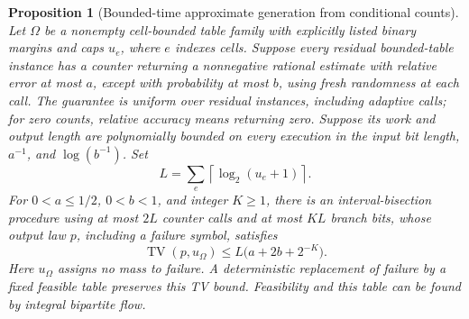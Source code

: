 \documentclass[11pt]{article}
\newtheorem{proposition}{Proposition}
\newcommand{\TV}{\operatorname{TV}}
\begin{document}
\begin{proposition}[Bounded-time approximate generation from conditional counts]
Let \(\Omega\) be a nonempty cell-bounded table family with explicitly listed binary margins and caps \(u_e\), where \(e\) indexes cells. Suppose every residual bounded-table instance has a counter returning a nonnegative rational estimate with relative error at most \(a\), except with probability at most \(b\), using fresh randomness at each call. The guarantee is uniform over residual instances, including adaptive calls; for zero counts, relative accuracy means returning zero. Suppose its work and output length are polynomially bounded on every execution in the input bit length, \(a^{-1}\), and \(\log(b^{-1})\).
Set
\[
 L=\sum_e\left\lceil\log_2(u_e+1)\right\rceil.
\]
For \(0<a\leq1/2\), \(0<b<1\), and integer \(K\geq1\), there is an interval-bisection procedure using at most \(2L\) counter calls and at most \(KL\) branch bits, whose output law \(p\), including a failure symbol, satisfies
\[
 \TV(p,u_\Omega)\leq
 L\bigl(a+2b+2^{-K}\bigr).
 \tag{*}\label{eq:bisection-budget}
\]
Here \(u_\Omega\) assigns no mass to failure. A deterministic replacement of failure by a fixed feasible table preserves this TV bound. Feasibility and this table can be found by integral bipartite flow.
\end{proposition}
\end{document}
